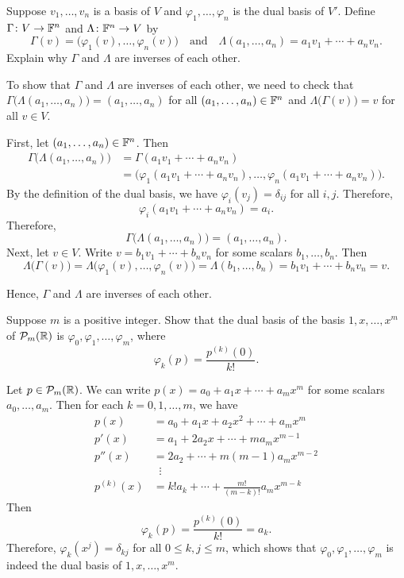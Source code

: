 \begin{exercise}
Suppose $v_1,\dots,v_n$ is a basis of $V$ and $\varphi_1,\dots,\varphi_n$ is the
dual basis of $V'$. Define $\Gamma\colon V\to\mathbb{F}^n$ and $\Lambda\colon\mathbb{F}^n\to V$
by
\[ \Gamma(v) = \bigl(\varphi_1(v),\dots,\varphi_n(v)\bigr) \quad\text{and}\quad
   \Lambda(a_1,\dots,a_n) = a_1v_1+\cdots+a_nv_n. \]
Explain why $\Gamma$ and $\Lambda$ are inverses of each other.
\end{exercise}
\begin{solution}
To show that $\Gamma$ and $\Lambda$ are inverses of each other, we need to check
that $\Gamma\bigl(\Lambda(a_1,\dots,a_n)\bigr)=(a_1,\dots,a_n)$ for all
$(a_1,\dots,a_n)\in\mathbb{F}^n$ and $\Lambda\bigl(\Gamma(v)\bigr)=v$ for all $v\in V$.

First, let $(a_1,\dots,a_n)\in\mathbb{F}^n$. Then
\begin{align*}
\Gamma\bigl(\Lambda(a_1,\dots,a_n)\bigr) &= \Gamma(a_1v_1+\cdots+a_nv_n)\\
 &= \bigl(\varphi_1(a_1v_1+\cdots+a_nv_n),\dots,
    \varphi_n(a_1v_1+\cdots+a_nv_n)\bigr).
\end{align*}
By the definition of the dual basis, we have $\varphi_i(v_j)=\delta_{ij}$ for all
$i,j$. Therefore,
\[ \varphi_i(a_1v_1+\cdots+a_nv_n) = a_i. \]
Therefore,
\[ \Gamma\bigl(\Lambda(a_1,\dots,a_n)\bigr) = (a_1,\dots,a_n). \]
Next, let $v\in V$. Write $v=b_1v_1+\cdots+b_nv_n$ for some scalars
$b_1,\dots,b_n$. Then
\[ \Lambda\bigl(\Gamma(v)\bigr) = \Lambda\bigl(\varphi_1(v),\dots,\varphi_n(v)\bigr)
   = \Lambda(b_1,\dots,b_n) = b_1v_1+\cdots+b_nv_n = v. \]

Hence, $\Gamma$ and $\Lambda$ are inverses of each other.
\end{solution}

\begin{exercise}
Suppose $m$ is a positive integer. Show that the dual basis of the basis
$1,x,\dots,x^m$ of $\mathcal{P}_m(\mathbb{R})$ is $\varphi_0,\varphi_1,\dots,\varphi_m$, where
\[ \varphi_k(p) = \frac{p^{(k)}(0)}{k!}. \]
\end{exercise}
\begin{solution}
Let $p\in\mathcal{P}_m(\mathbb{R})$. We can write $p(x)=a_0+a_1x+\cdots+a_mx^m$ for some
scalars $a_0,\dots,a_m$. Then for each $k=0,1,\dots,m$, we have
\begin{align*}
p(x) &= a_0+a_1x+a_2x^2+\cdots+a_mx^m\\
p'(x) &= a_1+2a_2x+\cdots+ma_mx^{m-1}\\
p''(x) &= 2a_2+\cdots+m(m-1)a_mx^{m-2}\\
&\;\;\vdots\\
p^{(k)}(x) &= k!a_k+\cdots+\frac{m!}{(m-k)!}a_mx^{m-k}
\end{align*}
Then
\[ \varphi_k(p) = \frac{p^{(k)}(0)}{k!} = a_k. \]
Therefore, $\varphi_k(x^j)=\delta_{kj}$ for all $0\le k,j\le m$, which shows
that $\varphi_0,\varphi_1,\dots,\varphi_m$ is indeed the dual basis of
$1,x,\dots,x^m$.
\end{solution}

